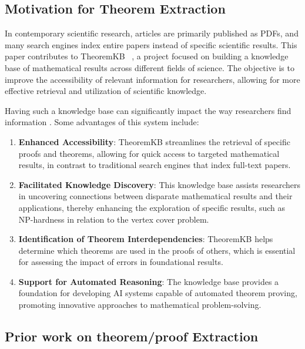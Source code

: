 \documentclass[runningheads]{llncs}
\begin{document}
\subsection{Motivation for Theorem Extraction}
In contemporary scientific research, articles are primarily published as PDFs, and many 
search engines index entire papers instead of specific scientific results. This paper 
contributes to TheoremKB ~\cite{doceng_paper}, a project focused on building a knowledge base of mathematical 
results across different fields of science. The objective is to improve the accessibility of 
relevant information for researchers, allowing for more effective retrieval and utilization 
of scientific knowledge.

Having such a knowledge base can significantly impact the way researchers find information \cite{mishra2024first}. 
Some advantages of this system include:

\begin{enumerate}
    \item \textbf{Enhanced Accessibility}: TheoremKB streamlines the retrieval of specific 
    proofs and theorems, allowing for quick access to targeted mathematical results, 
    in contrast to traditional search engines that index full-text papers.

    \item \textbf{Facilitated Knowledge Discovery}: This knowledge base assists researchers 
    in uncovering connections between disparate mathematical results and their applications, 
    thereby enhancing the exploration of specific results, such as NP-hardness in relation to 
    the vertex cover problem.

    \item \textbf{Identification of Theorem Interdependencies}: TheoremKB helps determine 
    which theorems are used in the proofs of others, which is essential for assessing the 
    impact of errors in foundational results.

    \item \textbf{Support for Automated Reasoning}: The knowledge base provides a foundation 
    for developing AI systems capable of automated theorem proving, promoting innovative 
    approaches to mathematical problem-solving.
\end{enumerate}

\subsection{Prior work on theorem/proof Extraction}
\end{document}

